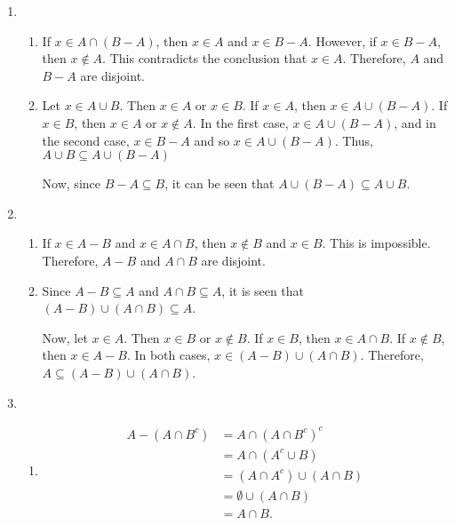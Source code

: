 \begin{enumerate}
\begin{enumerate}
\end{enumerate}


\item \begin{enumerate}
\item If $x \in A \cap \left( B - A \right)$, then $x \in A$ and $x \in B - A$.  However, if 
$x \in B - A$, then $x \notin A$.  This contradicts the conclusion that $x \in A$.  Therefore, 
$A$ and $B - A$ are disjoint.

\item Let $x \in A \cup B$.  Then $x \in A$ or $x \in B$.  If $x \in A$, then 
$x \in A \cup \left( B - A \right)$.  If $x \in B$, then $x \in A$ or $x \notin A$.  In the first case, $x \in A \cup \left( B - A \right)$, and in the second case, $x \in B - A$ and so 
$x \in A \cup \left( B - A \right)$.  Thus, $A \cup B \subseteq A \cup \left( B - A \right)$

Now, since $B - A \subseteq B$, it can be seen that 
$A \cup \left( B - A \right) \subseteq A \cup B$.
\end{enumerate}



\item \begin{enumerate}
\item If $x \in A - B$ and $x \in A \cap B$, then $x \notin B$ and $x \in B$.  This is impossible.  Therefore, $A - B$ and $A \cap B$ are disjoint.

\item Since $A - B \subseteq A$ and $A \cap B \subseteq A$, it is seen that 
$\left( A - B \right) \cup \left( A \cap B \right) \subseteq A$.

Now, let $x \in A$.  Then $x \in B$ or $x \notin B$.  If $x \in B$, then $x \in A \cap B$.  If 
$x \notin B$, then $x \in A - B$.  In both cases, 
$x \in \left( A - B \right) \cup \left( A \cap B \right)$.  Therefore, 
$A \subseteq \left( A - B \right) \cup \left( A \cap B \right)$.
\end{enumerate}


\item \begin{enumerate}
\item \begin{align*}
A - (A \cap B^c) &= A \cap (A \cap B^c)^c \\
                 &= A \cap (A^c \cup B) \\
                 &= (A \cap A^c) \cup (A \cap B) \\
                 &= \emptyset \cup (A \cap B) \\
                 &= A \cap B.
\end{align*}


\end{enumerate}
\end{enumerate}
